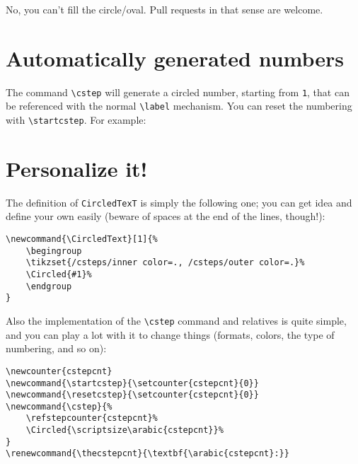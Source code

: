 \documentclass{ltxdoc}
\begin{document}
No, you can't fill the circle/oval. Pull requests in that sense are welcome.

\section{Automatically generated numbers}

The command \verb|\cstep| will generate a circled number, starting from \texttt{1}, that can be referenced with the normal \verb|\label| mechanism. You can reset the numbering with 
\verb|\startcstep|. For example:





\bigskip

\section{Personalize it!}

The definition of \verb|CircledTexT| is simply the following one; you can get idea and define your own easily (beware of spaces at the end of the lines, though!): 

\begin{lstlisting}
\newcommand{\CircledText}[1]{%
    \begingroup
    \tikzset{/csteps/inner color=., /csteps/outer color=.}%
    \Circled{#1}%
    \endgroup
}
\end{lstlisting}


Also the implementation of the \verb|\cstep| command and relatives is quite simple, and you can play a lot with it to change things (formats, colors, the type of numbering, and so on):

\begin{lstlisting}
\newcounter{cstepcnt}
\newcommand{\startcstep}{\setcounter{cstepcnt}{0}}
\newcommand{\resetcstep}{\setcounter{cstepcnt}{0}}
\newcommand{\cstep}{%
    \refstepcounter{cstepcnt}%
    \Circled{\scriptsize\arabic{cstepcnt}}%
}
\renewcommand{\thecstepcnt}{\textbf{\arabic{cstepcnt}:}}
\end{lstlisting}
\end{document}
